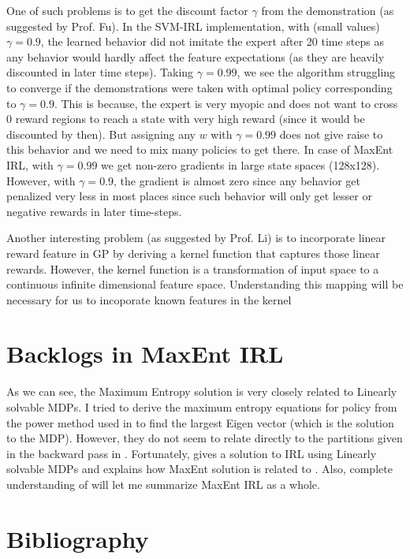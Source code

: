 \documentclass{article}[11pt]
\begin{document}
One of such problems is to get the discount factor $\gamma$ from the demonstration (as suggested by Prof. Fu). In the SVM-IRL implementation, with (small values) $\gamma = 0.9$, the learned behavior did not imitate the expert after 20 time steps as any behavior would hardly affect the feature expectations (as they are heavily discounted in later time steps). Taking $\gamma = 0.99$, we see the algorithm struggling to converge if the demonstrations were taken with optimal policy corresponding to  $\gamma = 0.9$. This is because, the expert is very myopic and does not want to cross 0 reward regions to reach a state with very high reward (since it would be discounted by then). But assigning any $w$ with $\gamma = 0.99$ does not give raise to this behavior and we need to mix many policies to get there. In case of MaxEnt IRL, with $\gamma = 0.99$ we get non-zero gradients in large state spaces (128x128). However, with $\gamma = 0.9$, the gradient is almost zero since any behavior get penalized very less in most places since such behavior will only get lesser or negative rewards in later time-steps. 

Another interesting problem (as suggested by Prof. Li) is to incorporate linear reward feature in GP by deriving a kernel function that captures those linear rewards. However, the kernel function is a transformation of input space to a continuous infinite dimensional feature space. Understanding this mapping will be necessary for us to incoporate known features in the kernel


\section{Backlogs in MaxEnt IRL}
As we can see, the Maximum Entropy solution is very closely related to Linearly solvable MDPs. I tried to derive the maximum entropy equations for policy from the power method used in \cite{dvijotham2010inverse} to find the largest Eigen vector (which is the solution to the MDP). However, they do not seem to relate directly to the partitions given in the backward pass in \cite{ziebart2008maximum}. Fortunately, \cite{dvijotham2010inverse} gives a solution to IRL using Linearly solvable MDPs and explains how MaxEnt solution is related to \cite{dvijotham2010inverse}. Also, complete understanding of \cite{bloem2014infinite} will let me summarize MaxEnt IRL as a whole. 

\section{Bibliography}



\end{document}
